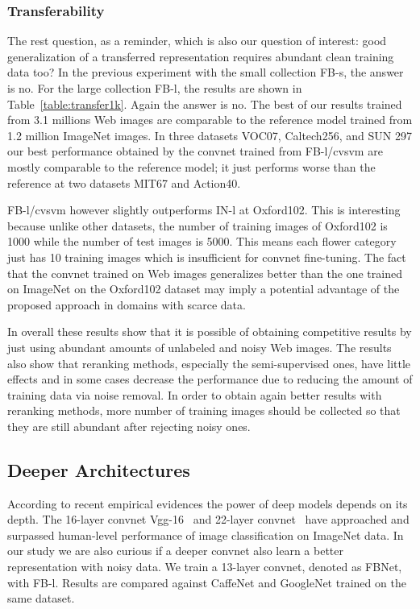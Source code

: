 \documentclass[preprint,12pt]{elsarticle}
\begin{document}
\subsubsection{Transferability}\label{sec:transfer1k}
\noindent The rest question, as a reminder, which is also our question of interest: good generalization of a transferred representation requires abundant clean training data too? In the previous experiment with the small collection FB-s, the answer is no. For the large collection FB-l, the results are shown in Table~\ref{table:transfer1k}. Again the answer is no. The best of our results trained from 3.1 millions Web images are comparable to the reference model trained from 1.2 million ImageNet images. In three datasets VOC07, Caltech256, and SUN 297 our best performance obtained by the convnet trained from FB-l/cvsvm are mostly comparable to the reference model; it just performs worse than the reference at two datasets MIT67 and Action40.  

FB-l/cvsvm however slightly outperforms IN-l at Oxford102. This is interesting because unlike other datasets, the number of training images of Oxford102 is 1000 while the number of test images is 5000. This means each flower category just has 10 training images which is insufficient for convnet fine-tuning. The fact that the convnet trained on Web images generalizes better than the one trained on ImageNet on the Oxford102 dataset may imply a potential advantage of the proposed approach in domains with scarce data. 

In overall these results show that it is possible of obtaining competitive results by just using abundant amounts of unlabeled and noisy Web images. The results also show that reranking methods, especially the semi-supervised ones, have little effects and in some cases decrease the performance due to reducing the amount of training data via noise removal. In order to obtain again better results with reranking methods, more number of training images should be collected so that they are still abundant after rejecting noisy ones.
\subsection{Deeper Architectures}
\noindent According to recent empirical evidences the power of deep models depends on its depth. The 16-layer convnet Vgg-16~\cite{DBLP:journals/corr/SimonyanZ14a} and 22-layer convnet~\cite{DBLP:journals/corr/SzegedyLJSRAEVR14} have approached and surpassed human-level performance of image classification on ImageNet data. In our study we are also curious if a deeper convnet also learn a better representation with  noisy data. We train a 13-layer convnet, denoted as FBNet, with FB-l. Results are compared against CaffeNet and GoogleNet trained on the same dataset.
\end{document}
